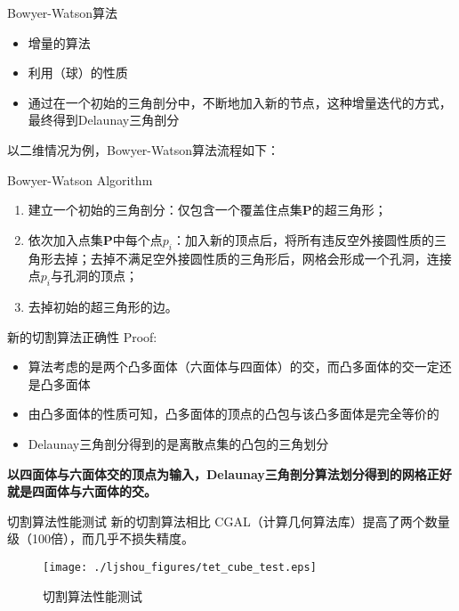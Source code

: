 \documentclass[mathserif]{beamer}
\begin{document}
\begin{CJK}{UTF8}{gkai}
\begin{frame}{Bowyer-Watson算法}
    \begin{itemize}
    		    \item 增量的算法
    		    \item 利用{（球）}的性质
    		    \item 通过在一个初始的三角剖分中，不断地加入新的节点，这种增量迭代的方式，最终得到Delaunay三角剖分
    \end{itemize}
            以二维情况为例，Bowyer-Watson算法流程如下：
            \begin{block}{Bowyer-Watson Algorithm}
                \begin{enumerate}
                    \item 建立一个初始的三角剖分：仅包含一个覆盖住点集{\bf P}的超三角形；
                    \item 依次加入点集{\bf P}中每个点$p_i$：加入新的顶点后，将所有违反空外接圆性质的三角形去掉；去掉不满足空外接圆性质的三角形后，网格会形成一个孔洞，连接点$p_i$与孔洞的顶点；
                    \item 去掉初始的超三角形的边。
                \end{enumerate}
            \end{block}
\end{frame}

\begin{frame}{新的切割算法正确性}
    Proof:
    \begin{itemize}
    		    \item 算法考虑的是两个凸多面体（六面体与四面体）的交，而凸多面体的交一定还是凸多面体
    		    \item 由凸多面体的性质可知，凸多面体的顶点的凸包与该凸多面体是完全等价的
    		    \item Delaunay三角剖分得到的是离散点集的凸包的三角划分
    \end{itemize}
    \begin{block}{}
    \color{red}\bf 以四面体与六面体交的顶点为输入，Delaunay三角剖分算法划分得到的网格正好就是四面体与六面体的交。
        \end{block}
\end{frame}

\begin{frame}{切割算法性能测试}
新的切割算法相比 CGAL（计算几何算法库）{\color{red}提高了两个数量级（100倍）}，而几乎不损失精度。
	\begin{figure}
		\centering
		\texttt{[image: ./ljshou\_figures/tet\_cube\_test.eps]}
		\caption{切割算法性能测试}
	\end{figure}
\end{frame}


\end{CJK}
\end{document}
